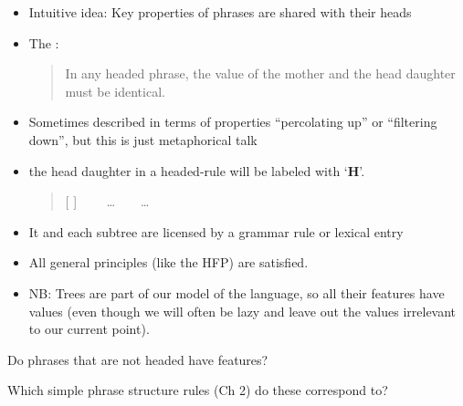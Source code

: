 \documentclass[a4paper,landscape,headrule,footrule]{foils}
\begin{document}
\begin{itemize}
\item Intuitive idea: Key properties of phrases are
shared with their heads
\item The :
  \begin{quote} \large    In any headed phrase, the 
    value of the mother and the head daughter
    must be identical.    
  \end{quote}
\item Sometimes described in terms of properties
“percolating up” or “filtering down”, but this
is just metaphorical talk
\item  the  head daughter in a headed-rule will be labeled with  `{\bf H}'.

  \begin{quote}
    [  ]  \ \ \into  \ \ \ldots \ \ \HD [\ \  \ ]  \ \ \ldots
  \end{quote}


\end{itemize}

\begin{itemize}
\item It and each subtree are licensed by a grammar rule
or lexical entry
\item All general principles (like the HFP) are satisfied.
\item NB: Trees are part of our model of the language,
so all their features have values (even though we
will often be lazy and leave out the values
irrelevant to our current point).
\end{itemize}

Do phrases that are not headed have
 features?


Which simple phrase structure rules (Ch 2) do these correspond to?
\end{document}
